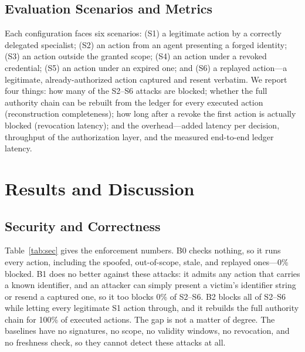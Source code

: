 \documentclass[conference]{IEEEtran}
\begin{document}
\subsection{Evaluation Scenarios and Metrics}
Each configuration faces six scenarios: (S1) a legitimate action by a correctly delegated specialist; (S2) an action from an agent presenting a forged identity; (S3) an action outside the granted scope; (S4) an action under a revoked credential; (S5) an action under an expired one; and (S6) a replayed action---a legitimate, already-authorized action captured and resent verbatim. We report four things: how many of the S2--S6 attacks are blocked; whether the full authority chain can be rebuilt from the ledger for every executed action (reconstruction completeness); how long after a revoke the first action is actually blocked (revocation latency); and the overhead---added latency per decision, throughput of the authorization layer, and the measured end-to-end ledger latency.

\section{Results and Discussion}\label{sec:res}
\subsection{Security and Correctness}
Table~\ref{tab:sec} gives the enforcement numbers. B0 checks nothing, so it runs every action, including the spoofed, out-of-scope, stale, and replayed ones---0\% blocked. B1 does no better against these attacks: it admits any action that carries a known identifier, and an attacker can simply present a victim's identifier string or resend a captured one, so it too blocks 0\% of S2--S6. B2 blocks all of S2--S6 while letting every legitimate S1 action through, and it rebuilds the full authority chain for 100\% of executed actions. The gap is not a matter of degree. The baselines have no signatures, no scope, no validity windows, no revocation, and no freshness check, so they cannot detect these attacks at all.
\end{document}
